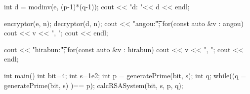\documentclass[xelatex, 11pt, a4paper, ja=standard]{bxjsarticle}
\begin{document}
\begin{mylisting}[language=c++,caption=演習課題8のソースコード]
{    int d = modinv(e, (p-1)*(q-1));
    cout << "d: "<< d << endl;

    encryptor(e, n);
    decryptor(d, n);
    cout << "angou:\t";
    for(const auto &v : angou){
        cout << v << ", ";
    } cout << endl;

    cout << "hirabun:\t";
    for(const auto &v : hirabun){
        cout << v << ", ";
    } cout << endl;

}

int main(){
    int bit=4;
    int s=1e2;
    int p = generatePrime(bit, s);
    int q;
    while((q = generatePrime(bit, s) )== p){};
   calcRSASystem(bit, s, p, q);
}

\end{mylisting}
\end{document}

